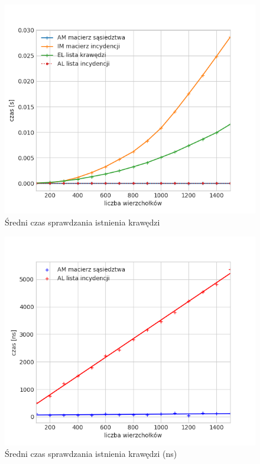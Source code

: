 \documentclass[11pt,twocolumn]{article}
\begin{document}
\begin{figure}[h]
	\includegraphics[width=\linewidth]{wyszukaj.png}
	\caption{Średni czas sprawdzania istnienia krawędzi \label{wyszukaj}}
\end{figure}

\begin{figure}[h!]
	\includegraphics[width=\linewidth]{wyszukaj-nano.png}
	\caption{Średni czas sprawdzania istnienia krawędzi (ns) \label{wyszukaj-nano}}
\end{figure}
\end{document}
